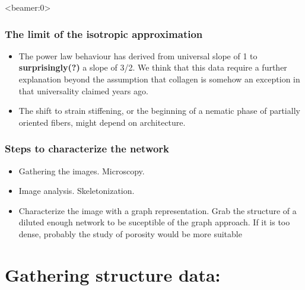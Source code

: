 \documentclass[10pt]{beamer}
\begin{document}
\begin{frame}<beamer:0>
  \frametitle{The limit of the isotropic approximation}
  \begin{itemize}
    \item The power law behaviour has derived from universal slope of 1 \cite{mackintosh_bill} to \textbf{surprisingly(?)} a slope of  3/2. We think that this data require a further explanation beyond the assumption that collagen is somehow an exception in that universality claimed years ago.
    \item The shift to strain stiffening, or the beginning of a nematic phase of partially oriented fibers, might depend on architecture.
  \end{itemize}
\end{frame}
\begin{frame}
  \frametitle{Steps to characterize the network}
  \begin{itemize}
    \item Gathering the images. Microscopy.
    \item Image analysis. Skeletonization.
    \item Characterize the image with a graph representation.
      \note
      {
        Grab the structure of a diluted enough network to be suceptible of the graph approach.
        If it is too dense, probably the study of porosity would be more suitable
      }
  \end{itemize}
      \begin{center}
      \end{center}
\end{frame}

\section{Gathering structure data:}
\end{document}
